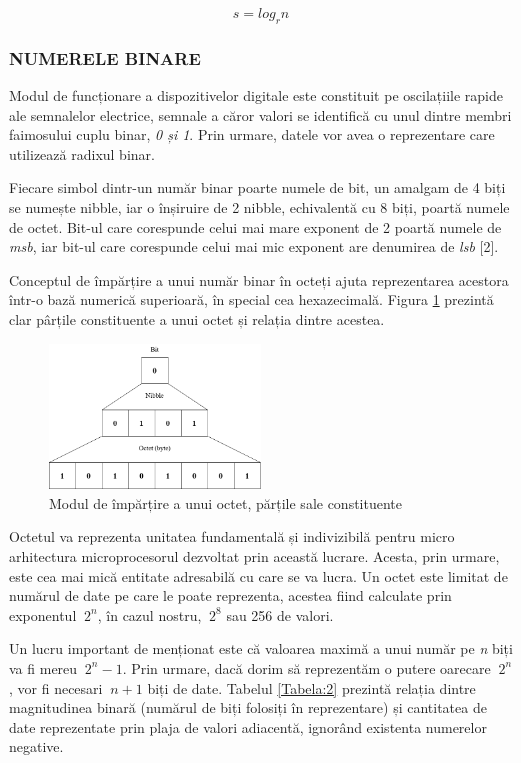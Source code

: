 \documentclass[12pt]{article}
\begin{document}
\begin{equation}
\label{Formula:1}
s = log_r n
\end{equation}


\subsubsection{NUMERELE BINARE}
Modul de funcționare a dispozitivelor digitale  este constituit pe oscilațiile rapide ale semnalelor electrice, semnale a căror valori se identifică cu unul dintre membri faimosului cuplu binar, \textit{0 și 1}. Prin urmare, datele vor avea o reprezentare care utilizează radixul binar. 

Fiecare simbol dintr-un număr binar poarte numele de bit, un amalgam de 4 biți se numește nibble, iar o înșiruire de 2 nibble, echivalentă cu 8 biți, poartă numele de octet. Bit-ul care corespunde celui mai mare exponent de 2 poartă numele de \textit{msb}, iar bit-ul care corespunde celui mai mic exponent are denumirea de \textit{lsb} [2].

Conceptul de împărțire a unui număr binar în octeți ajuta reprezentarea acestora într-o bază numerică superioară, în special cea hexazecimală. Figura \ref{Figura:1} prezintă clar pârțile constituente a unui octet și relația dintre acestea.

 \begin{figure}[h!]
 \includegraphics[width=0.5\textwidth]{byte.png}
 \centering
 \caption{Modul de împărțire a unui octet, părțile sale constituente}
 \label{Figura:1}
 \end{figure}

Octetul va reprezenta unitatea fundamentală și indivizibilă pentru micro arhitectura microprocesorul dezvoltat prin această lucrare. Acesta, prin urmare, este cea mai mică entitate adresabilă cu care se va lucra. Un octet este limitat de numărul de date pe care le poate reprezenta, acestea fiind calculate prin exponentul $\ 2^n$, în cazul nostru, $\ 2^8$ sau 256 de valori.

Un lucru important de menționat este că valoarea maximă a unui număr pe \textit{n} biți va fi mereu $\ 2^n -1$. Prin urmare, dacă dorim să reprezentăm o putere oarecare $\ 2^n$, vor fi necesari $\ n +1$ biți de date.
Tabelul \ref{Tabela:2} prezintă relația dintre magnitudinea binară (numărul de biți folosiți în reprezentare) și cantitatea de date reprezentate prin plaja de valori adiacentă, ignorând existenta numerelor negative.
\end{document}

